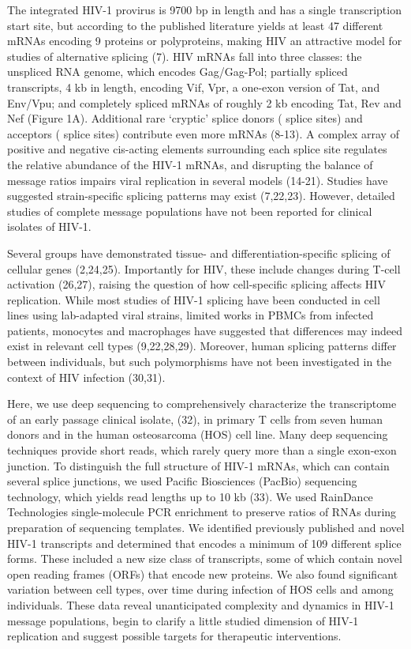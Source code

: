 \documentclass[../sherrill-Mix_thesis.tex]{subfiles}
\begin{document}
The integrated HIV-1 provirus is \approximately{}9700 bp in length and has a single transcription start site, but according to the published literature yields at least 47 different mRNAs encoding 9 proteins or polyproteins, making HIV an attractive model for studies of alternative splicing (7). HIV mRNAs fall into three classes: the unspliced RNA genome, which encodes Gag/Gag-Pol; partially spliced transcripts, \approximately{}4 kb in length, encoding Vif, Vpr, a one-exon version of Tat, and Env/Vpu; and completely spliced mRNAs of roughly 2 kb encoding Tat, Rev and Nef (Figure 1A). Additional rare `cryptic' splice donors (\fivePrime{} splice sites) and acceptors (\threePrime{} splice sites) contribute even more mRNAs (8-13). A complex array of positive and negative cis-acting elements surrounding each splice site regulates the relative abundance of the HIV-1 mRNAs, and disrupting the balance of message ratios impairs viral replication in several models (14-21). Studies have suggested strain-specific splicing patterns may exist (7,22,23). However, detailed studies of complete message populations have not been reported for clinical isolates of HIV-1. 

Several groups have demonstrated tissue- and differentiation-specific splicing of cellular genes (2,24,25). Importantly for HIV, these include changes during T-cell activation (26,27), raising the question of how cell-specific splicing affects HIV replication. While most studies of HIV-1 splicing have been conducted in cell lines using lab-adapted viral strains, limited works in PBMCs from infected patients, monocytes and macrophages have suggested that differences may indeed exist in relevant cell types (9,22,28,29). Moreover, human splicing patterns differ between individuals, but such polymorphisms have not been investigated in the context of HIV infection (30,31).

Here, we use deep sequencing to comprehensively characterize the transcriptome of an early passage clinical isolate, \hivEight{} (32), in primary \cdFour{} T cells from seven human donors and in the human osteosarcoma (HOS) cell line. Many deep sequencing techniques provide short reads, which rarely query more than a single exon-exon junction. To distinguish the full structure of HIV-1 mRNAs, which can contain several splice junctions, we used Pacific Biosciences (PacBio) sequencing technology, which yields read lengths up to 10 kb (33). We used RainDance Technologies single-molecule PCR enrichment to preserve ratios of RNAs during preparation of sequencing templates. We identified previously published and novel HIV-1 transcripts and determined that \hivEight{} encodes a minimum of 109 different splice forms. These included a new size class of transcripts, some of which contain novel open reading frames (ORFs) that encode new proteins. We also found significant variation between cell types, over time during infection of HOS cells and among individuals. These data reveal unanticipated complexity and dynamics in HIV-1 message populations, begin to clarify a little studied dimension of HIV-1 replication and suggest possible targets for therapeutic interventions. 
\end{document}
